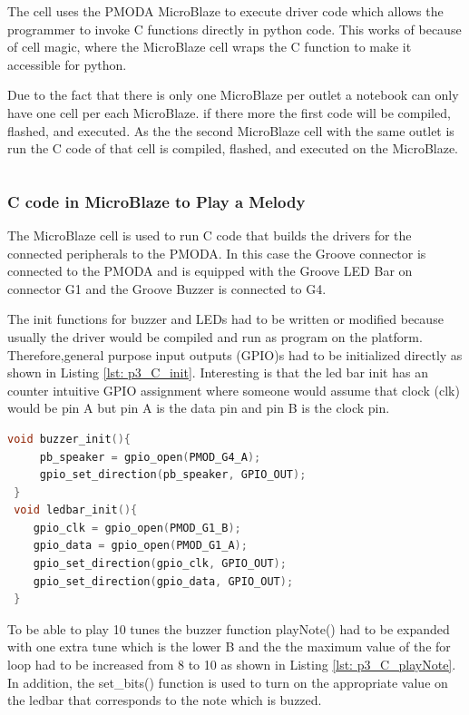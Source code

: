 The cell uses the PMODA MicroBlaze to execute driver code which allows the programmer to invoke C functions directly in python code. This works of because of cell magic, where the MicroBlaze cell wraps the C function to make it accessible for python.

Due to the fact that there is only one MicroBlaze per outlet a notebook can only have one cell per each MicroBlaze. if there more the first code will be compiled, flashed, and executed. As the the second MicroBlaze cell with the same outlet is run the C code of that cell is compiled, flashed, and executed on the MicroBlaze. 

\begin{lstlisting}[style=PythonStyle, language=Python, caption={Magic microblaze command.},label=lst: p3_microblaze]
%%microblaze base.PMODA
\end{lstlisting}

\subsubsection{C code in MicroBlaze to Play a Melody} 
The MicroBlaze cell is used to run C code that builds the drivers for the connected peripherals to the PMODA. In this case the Groove connector is connected to the PMODA and is equipped with the Groove LED Bar on connector G1 and the Groove Buzzer is connected to G4.

The init functions for buzzer and LEDs had to be written or modified because usually the driver would be compiled and run as program on the platform. Therefore,general purpose input outputs (GPIO)s had to be initialized directly as shown in Listing \ref{lst: p3_C_init}. Interesting is that the led  bar init has an counter intuitive GPIO assignment where someone would assume that clock (clk) would be pin A but pin A is the data pin and pin B is the clock pin. 
\lstset{style=CStyle}
 \begin{lstlisting}[language=C, basicstyle=\footnotesize, caption={Magic microblaze C code for buzzer and ledbar initialization .},label=lst: p3_C_init]
 void buzzer_init(){
     pb_speaker = gpio_open(PMOD_G4_A);
     gpio_set_direction(pb_speaker, GPIO_OUT);
 }
 void ledbar_init(){  
    gpio_clk = gpio_open(PMOD_G1_B);
    gpio_data = gpio_open(PMOD_G1_A);
    gpio_set_direction(gpio_clk, GPIO_OUT);
    gpio_set_direction(gpio_data, GPIO_OUT);
 }
 \end{lstlisting}
 
 To be able to play 10 tunes the buzzer function playNote() had to be expanded with one extra tune which is the lower B and the the maximum value of the for loop had to be increased from 8 to 10 as shown in Listing \ref{lst: p3_C_playNote}. In addition, the set\_bits() function is used to turn on the appropriate value on the ledbar that corresponds to the note which is buzzed.

